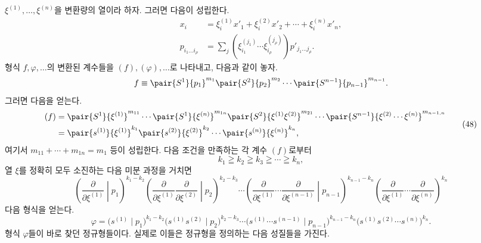 
$\xi^{(1)},\ldots,\xi^{(n)}$을 변환량의 열이라 하자. 그러면 다음이 성립한다.
\begin{equation}
\begin{aligned}
x_i&=\xi_i^{(1)}x'_1+\xi_i^{(2)}x'_2+\cdots+\xi_i^{(n)}x'_n,\\
p_{i_1\ldots i_\rho}&=\sum_j(\xi_{i_1}^{(j_1)}\cdots \xi_{i_\rho}^{(j_\rho)})p'_{j_1\ldots j_\rho}.
\end{aligned}
\tag{47}
\end{equation}
형식 $f,\varphi,\ldots$의 변환된 계수들을 $(f),(\varphi),\ldots$로 나타내고, 다음과 같이 놓자.
\[
 f\equiv\pair{S^1}{p_1}^{m_1}\pair{S^2}{p_2}^{m_2}\cdots\pair{S^{n-1}}{p_{n-1}}^{m_{n-1}}.
\]
그러면 다음을 얻는다.
\begin{equation}
\begin{aligned}
(f)&=\pair{S^1}{\xi^{(1)}}^{m_{11}}\cdots\pair{S^1}{\xi^{(n)}}^{m_{1n}}
\pair{S^2}{\xi^{(1)}\xi^{(2)}}^{m_{21}}\cdots
\pair{S^{n-1}}{\xi^{(2)}\cdots\xi^{(n)}}^{m_{n-1,n}}\\
&=\pair{s^{(1)}}{\xi^{(1)}}^{k_1}\pair{s^{(2)}}{\xi^{(2)}}^{k_2}\cdots\pair{s^{(n)}}{\xi^{(n)}}^{k_n},
\end{aligned}
\tag{48}
\end{equation}
여기서 $m_{11}+\cdots+m_{1n}=m_1$ 등이 성립한다. 다음 조건을 만족하는 각 계수 $(f)$로부터
\begin{equation}
 k_1\geqq k_2\geqq k_3\geqq\cdots\geqq k_n,
\tag{49}
\end{equation}
열 $\xi$를 정확히 모두 소진하는 다음 미분 과정을 거치면
\begin{equation}
\left(\frac{\partial}{\partial\xi^{(1)}}\middle|p_1\right)^{k_1-k_2}
\left(\frac{\partial}{\partial\xi^{(1)}}\frac{\partial}{\partial\xi^{(2)}}\middle|p_2\right)^{k_2-k_3}
\cdots
\left(\frac{\partial}{\partial\xi^{(1)}}\cdots\frac{\partial}{\partial\xi^{(n-1)}}\middle|p_{n-1}\right)^{k_{n-1}-k_n}
\left(\frac{\partial}{\partial\xi^{(1)}}\cdots\frac{\partial}{\partial\xi^{(n)}}\right)^{k_n}
\tag{50}
\end{equation}
다음 형식을 얻는다.
\begin{equation}
 \varphi=\bigl(s^{(1)}\mid p_1\bigr)^{k_1-k_2}
 \bigl(s^{(1)}s^{(2)}\mid p_2\bigr)^{k_2-k_3}\cdots
 \bigl(s^{(1)}\cdots s^{(n-1)}\mid p_{n-1}\bigr)^{k_{n-1}-k_n}
 \bigl(s^{(1)}s^{(2)}\cdots s^{(n)}\bigr)^{k_n}.
\tag{51}
\end{equation}
형식 $\varphi$들이 바로 찾던 정규형들이다. 실제로 이들은 정규형을 정의하는 다음 성질들을 가진다.
